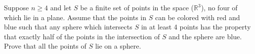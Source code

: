 Suppose $n\geq 4$ and let $S$ be a finite set of points in the space ($\mathbb{R}^3$), no four of which lie in a plane. Assume that the points in $S$ can be colored with red and blue such that any sphere which intersects $S$ in at least 4 points has the property that exactly half of the points in the intersection of $S$ and the sphere are blue. Prove that all the points of $S$ lie on a sphere.